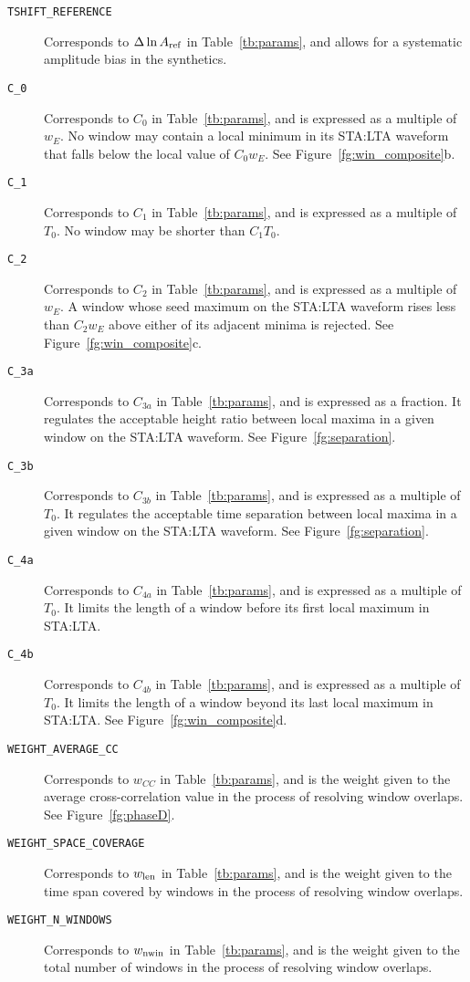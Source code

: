 \begin{description}
\item[{\tt TSHIFT\_REFERENCE}]Corresponds to $\Delta\ln{A}_{\rm ref}$ in Table~\ref{tb:params}, and allows for a systematic amplitude bias in the synthetics.
\item[{\tt C\_0}]Corresponds to $C_0$ in Table~\ref{tb:params}, and is expressed as a multiple of $w_E$.  No window may contain a local minimum in its STA:LTA waveform that falls below the local value of $C_0 w_E$.  See Figure~\ref{fg:win_composite}b.
\item[{\tt C\_1}]Corresponds to $C_1$ in Table~\ref{tb:params}, and is expressed as a multiple of $T_0$.  No window may be shorter than $C_1 T_0$.
\item[{\tt C\_2}]Corresponds to $C_2$ in Table~\ref{tb:params}, and is expressed as a multiple of $w_E$.  A window whose seed maximum on the STA:LTA waveform rises less than $C_2 w_E$ above either of its adjacent minima is rejected.  See Figure~\ref{fg:win_composite}c.
\item[{\tt C\_{3a}}]Corresponds to $C_{3a}$ in Table~\ref{tb:params}, and is expressed as a fraction.  It regulates the acceptable height ratio between local maxima in a given window on the STA:LTA waveform.  See Figure~\ref{fg:separation}.
\item[{\tt C\_{3b}}]Corresponds to $C_{3b}$ in Table~\ref{tb:params}, and is expressed as a multiple of $T_0$.  It regulates the acceptable time separation between local maxima in a given window on the STA:LTA waveform.  See Figure~\ref{fg:separation}.
\item[{\tt C\_{4a}}]Corresponds to $C_{4a}$ in Table~\ref{tb:params}, and is expressed as a multiple of $T_0$.  It limits the length of a window before its first local maximum in STA:LTA. 
\item[{\tt C\_{4b}}]Corresponds to $C_{4b}$ in Table~\ref{tb:params}, and is expressed as a multiple of $T_0$.  It limits the length of a window beyond its last local maximum in STA:LTA.  See Figure~\ref{fg:win_composite}d.
\item[{\tt WEIGHT\_AVERAGE\_CC}]Corresponds to $w_{CC}$ in Table~\ref{tb:params}, and is the weight given to the average cross-correlation value in the process of resolving window overlaps. See Figure~\ref{fg:phaseD}.
\item[{\tt WEIGHT\_SPACE\_COVERAGE}]Corresponds to $w_{\rm len}$ in Table~\ref{tb:params}, and is the weight given to the time span covered by windows in the process of resolving window overlaps. 
\item[{\tt WEIGHT\_N\_WINDOWS}]Corresponds to $w_{\rm nwin}$ in Table~\ref{tb:params}, and is the weight given to the total number of windows in the process of resolving window overlaps. 
\end{description}

